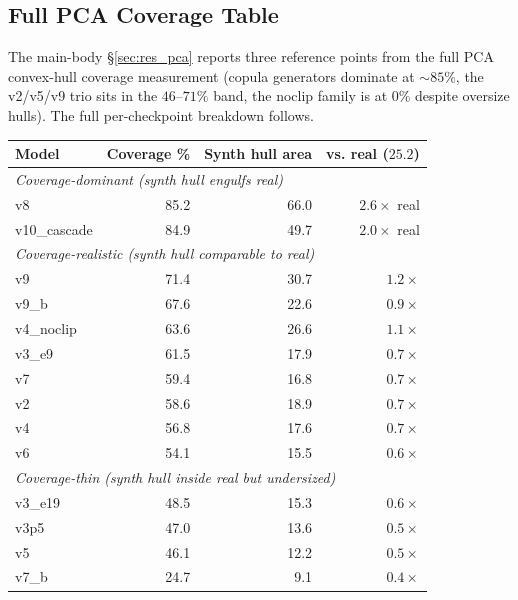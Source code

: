 \documentclass[journal]{IEEEtran}
\theoremstyle{definition}   %
\begin{document}
\subsection{Full PCA Coverage Table}
\label{app:pca_coverage_full}

The main-body §\ref{sec:res_pca} reports three reference points
from the full PCA convex-hull coverage measurement (copula
generators dominate at $\sim 85\%$, the v2/v5/v9 trio sits in the
$46$--$71\%$ band, the noclip family is at $0\%$ despite oversize
hulls). The full per-checkpoint breakdown follows.

\begin{table}[ht]
    \centering
    \footnotesize
    \begin{tabular}{lrrr}
        \toprule
        Model & Coverage \% & Synth hull area & vs. real ($25.2$) \\
        \midrule
        \multicolumn{4}{l}{\textit{Coverage-dominant (synth hull engulfs real)}} \\
        v8           & 85.2 & 66.0 & $2.6\times$ real \\
        v10\_cascade & 84.9 & 49.7 & $2.0\times$ real \\
        \midrule
        \multicolumn{4}{l}{\textit{Coverage-realistic (synth hull comparable to real)}} \\
        v9           & 71.4 & 30.7 & $1.2\times$ \\
        v9\_b        & 67.6 & 22.6 & $0.9\times$ \\
        v4\_noclip   & 63.6 & 26.6 & $1.1\times$ \\
        v3\_e9       & 61.5 & 17.9 & $0.7\times$ \\
        v7           & 59.4 & 16.8 & $0.7\times$ \\
        v2           & 58.6 & 18.9 & $0.7\times$ \\
        v4           & 56.8 & 17.6 & $0.7\times$ \\
        v6           & 54.1 & 15.5 & $0.6\times$ \\
        \midrule
        \multicolumn{4}{l}{\textit{Coverage-thin (synth hull inside real but undersized)}} \\
        v3\_e19      & 48.5 & 15.3 & $0.6\times$ \\
        v3p5         & 47.0 & 13.6 & $0.5\times$ \\
        v5           & 46.1 & 12.2 & $0.5\times$ \\
        v7\_b        & 24.7 & 9.1  & $0.4\times$ \\

\end{tabular}
\end{table}
\end{document}
